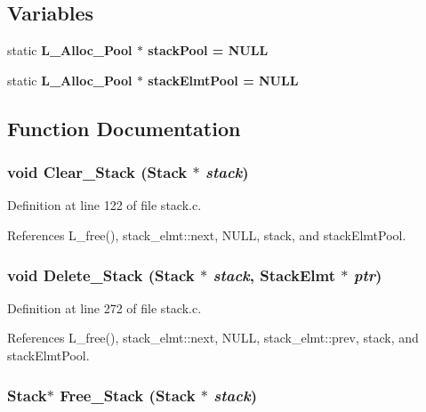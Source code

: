 \subsection*{Variables}
\begin{CompactItemize}
\item 
static \bf{L\_\-Alloc\_\-Pool} $\ast$ \bf{stack\-Pool} = NULL
\item 
static \bf{L\_\-Alloc\_\-Pool} $\ast$ \bf{stack\-Elmt\-Pool} = NULL
\end{CompactItemize}


\subsection{Function Documentation}
\subsubsection{\setlength{\rightskip}{0pt plus 5cm}void Clear\_\-Stack (\bf{Stack} $\ast$ {\em stack})}\label{stack_8c_b45b82506f64b0e7ef9a027546a51711}




Definition at line 122 of file stack.c.

References L\_\-free(), stack\_\-elmt::next, NULL, stack, and stack\-Elmt\-Pool.
\subsubsection{\setlength{\rightskip}{0pt plus 5cm}void Delete\_\-Stack (\bf{Stack} $\ast$ {\em stack}, \bf{Stack\-Elmt} $\ast$ {\em ptr})}\label{stack_8c_e57980dc5bb79ef4228083a4cd1e1eee}




Definition at line 272 of file stack.c.

References L\_\-free(), stack\_\-elmt::next, NULL, stack\_\-elmt::prev, stack, and stack\-Elmt\-Pool.
\subsubsection{\setlength{\rightskip}{0pt plus 5cm}\bf{Stack}$\ast$ Free\_\-Stack (\bf{Stack} $\ast$ {\em stack})}\label{stack_8c_75dc5a1eb36f56f194c6d77a744bd7b9}




